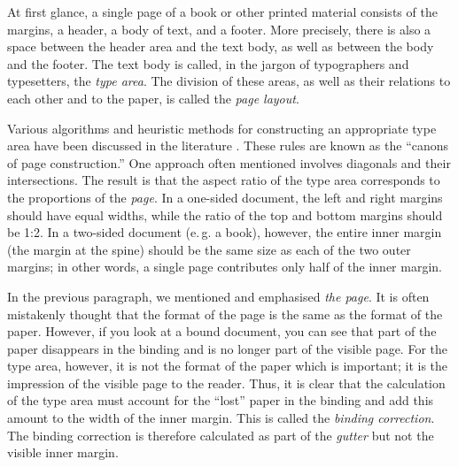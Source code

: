 \begin{Explain}
  At first glance, a single page of a book or other printed material
  consists of the margins,
  \iffalse%
  \footnote{The author and the editor have considered the question as to 
    whether, since a page has only one periphery, the term should be
	``the margin.'' However, since \LaTeX{} logically divides this one
	margin into several margins, which are determined separately, we
    use the term ``the margins'' here.}%
  \fi%
  a header, a body of text, and a footer. More precisely, there 
  is also a space between the header area and the text
  body, as well as between the body and the footer. The text body is
  called, in the jargon of typographers and typesetters, the \emph{type area}.
  The division of these areas, as well as their relations to each other and
  to the paper, is called the \emph{page layout}.

  Various algorithms and heuristic methods for constructing an appropriate
  type area have been discussed in the literature%
  .
  These rules are known as the ``canons of page construction.'' One approach
  often mentioned involves diagonals and their intersections. The result is
  that the aspect ratio of the type area corresponds to the proportions of the
  \emph{page}. In a one-sided document, the left and right
  margins should have equal widths, while the ratio of the top and bottom
  margins should be 1:2. In a two-sided document (e.\,g. a
  book), however, the entire inner margin (the margin at the spine) should be
  the same size as each of the two outer margins; in other words, a single
  page contributes only half of the inner margin.

  In the previous paragraph, we mentioned and emphasised \emph{the page}. It
  is often mistakenly thought that the format of the page is the same as the
  format of the paper.%
   However, if you look at
  a bound document, you can see that part of the paper disappears in the
  binding and is no longer part of the visible page.
  For the type area, however, it is not the format of the paper which is
  important; it is the impression of the visible page to the reader. Thus, it
  is clear that the calculation of the type area must account for the ``lost''
  paper in the binding and add this amount to the width of the inner margin.
  This is called the \emph{binding correction}. The binding correction is therefore calculated as part of the
  \emph{gutter} but not the visible inner margin.


\end{Explain}
